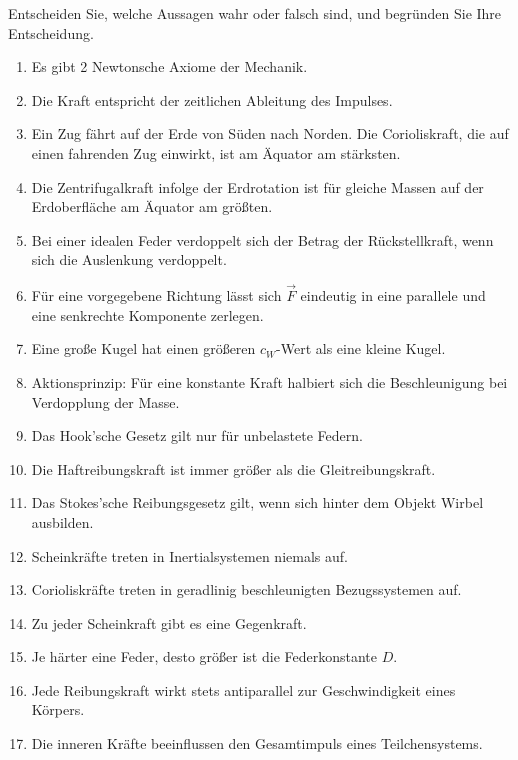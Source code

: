 \begin{ExerciseBlock}
Entscheiden Sie, welche Aussagen wahr oder falsch sind, und begründen Sie Ihre Entscheidung.
\begin{enumerate}
\item Es gibt 2 Newtonsche Axiome der Mechanik.
\item Die Kraft entspricht der zeitlichen Ableitung des Impulses.
\item Ein Zug fährt auf der Erde von Süden nach Norden. Die Corioliskraft, die auf einen fahrenden Zug einwirkt, ist am Äquator am stärksten.
\item Die Zentrifugalkraft infolge der Erdrotation ist für gleiche Massen auf der Erdoberfläche am Äquator am größten.
\item Bei einer idealen Feder verdoppelt sich der Betrag der Rückstellkraft, wenn sich die Auslenkung verdoppelt.
\item Für eine vorgegebene Richtung lässt sich $\vec F$ eindeutig in eine parallele und eine senkrechte Komponente zerlegen.
\item Eine große Kugel hat einen größeren $c_W$-Wert als eine kleine Kugel.
\item Aktionsprinzip: Für eine konstante Kraft halbiert sich die Beschleunigung bei Verdopplung der Masse.
\item Das Hook'sche Gesetz gilt nur für unbelastete Federn.
\item Die Haftreibungskraft ist immer größer als die Gleitreibungskraft.
\item Das Stokes'sche Reibungsgesetz gilt, wenn sich hinter dem Objekt Wirbel ausbilden.
\item Scheinkräfte treten in Inertialsystemen niemals auf.
\item Corioliskräfte treten in geradlinig beschleunigten Bezugssystemen auf.
\item Zu jeder Scheinkraft gibt es eine Gegenkraft.
\item Je härter eine Feder, desto größer ist die Federkonstante $D$.
\item Jede Reibungskraft wirkt stets antiparallel zur Geschwindigkeit eines Körpers.
\item Die inneren Kräfte beeinflussen den Gesamtimpuls eines Teilchensystems.
\end{enumerate}
\end{ExerciseBlock}
